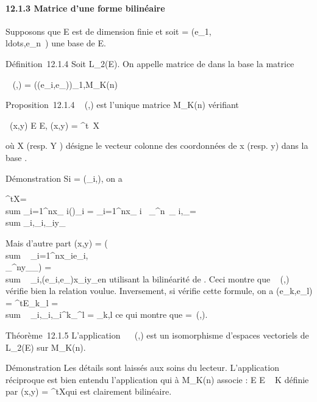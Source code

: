\documentclass[]{article}
\begin{document}
\paragraph{12.1.3 Matrice d'une forme bilinéaire}

Supposons que E est de dimension finie et soit  =
(e\_1,\\ldots,e\_n~)
une base de E.

Définition~12.1.4 Soit \phi \in L\_2(E). On appelle matrice de \phi dans
la base  la matrice

\mathrmMat~ (\phi,) =
(\phi(e\_i,e\_\jmath))\_1\leqi,\jmath\leqn \in M\_K(n)

Proposition~12.1.4
\mathrmMat~ (\phi,) est
l'unique matrice \Omega \in M\_K(n) vérifiant

\forall~(x,y) \in E \times E, \phi(x,y) = ^t~X\OmegaY

où X (resp. Y ) désigne le vecteur colonne des coordonnées de x (resp.
y) dans la base .

Démonstration Si \Omega = (\omega\_i,\jmath), on a

 ^tX\OmegaY = \\sum
\_i=1^nx\_ i(\OmegaY )\_i =
\sum \_i=1^nx\_ i~
\sum \_^n\omega~\_
i,\jmathy\_\jmath = \\sum
\_i,\jmath\omega\_i,\jmathx\_iy\_\jmath

Mais d'autre part \phi(x,y) =
\phi(\\sum ~
\_i=1^nx\_ie\_i,\\\sum
 \_^ny\_\jmathe\_\jmath)
= \\sum ~
\_i,\jmath\phi(e\_i,e\_\jmath)x\_iy\_\jmath en
utilisant la bilinéarité de \phi. Ceci montre que
\mathrmMat~ (\phi,) vérifie
bien la relation voulue. Inversement, si \Omega vérifie cette formule, on a
\phi(e\_k,e\_l) = ^tE\_k\OmegaE\_l
= \\sum ~
\_i,\jmath\omega\_i,\jmath\delta\_i^k\delta\_\jmath^l =
\omega\_k,l ce qui montre que \Omega =\
\mathrmMat (\phi,).

Théorème~12.1.5 L'application
\phi\mapsto~\mathrmMat~
(\phi,) est un isomorphisme d'espaces vectoriels de L\_2(E) sur
M\_K(n).

Démonstration Les détails sont laissés aux soins du lecteur.
L'application réciproque est bien entendu l'application qui à \Omega \in
M\_K(n) associe \phi : E \times E \rightarrow~ K définie par \phi(x,y) =
^tX\OmegaY qui est clairement bilinéaire.
\end{document}
